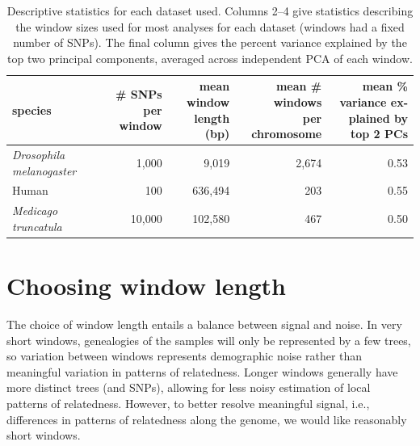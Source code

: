 \documentclass[11pt, oneside]{article}   	%
\begin{document}
\begin{table}[ht]
\centering
    \begin{tabular}{p{0.8in}rrrr}
  \hline
    species 
    & \parbox[t]{.8in}{\# SNPs per \\ window} 
    & \parbox[t]{1in}{mean window\\ length (bp)}
    & \parbox[t]{1.2in}{mean \# windows \\ per chromosome} 
    & \parbox[t]{1.4in}{mean \% variance ex-\\plained by top 2 PCs} \\ 
  \hline
  \textit{Drosophila melanogaster} & 1,000 & 9,019 & 2,674 & 0.53 \\ 
  Human & 100 & 636,494 & 203 & 0.55 \\ 
  \textit{Medicago truncatula} & 10,000 & 102,580 & 467 & 0.50 \\ 
   \hline
\end{tabular}
\caption{
    Descriptive statistics for each dataset used.
    Columns 2--4 give statistics describing the window sizes used for most analyses for each dataset
    (windows had a fixed number of SNPs).
    The final column gives the percent variance explained by the top two principal components,
    averaged across independent PCA of each window.
    \label{tab:data_stats}
}
\end{table}




  

\appendix
\setcounter{table}{0}
\renewcommand{\thetable}{S\arabic{table}}
\setcounter{figure}{0}
\renewcommand{\thefigure}{S\arabic{figure}}


\section{Choosing window length}
\label{apx:window_length}

The choice of window length entails a balance between signal and noise.
In very short windows, genealogies of the samples will only be represented by a few trees,
so variation between windows represents demographic noise rather than meaningful variation in patterns of relatedness.
Longer windows generally have more distinct trees (and SNPs), 
allowing for less noisy estimation of local patterns of relatedness.
However, to better resolve meaningful signal, i.e., differences in patterns of relatedness along the genome,
we would like reasonably short windows.
\end{document}
